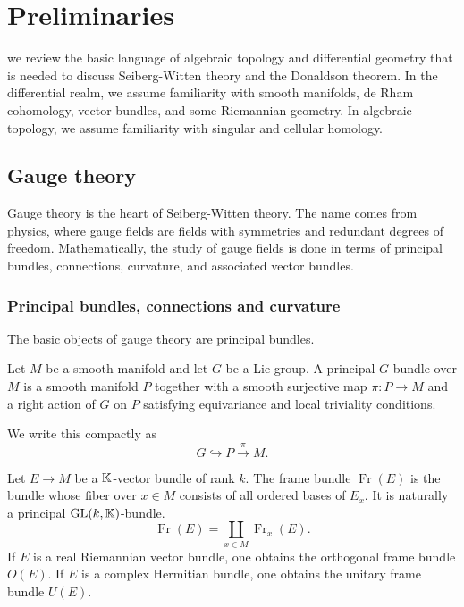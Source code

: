 \chapter{Preliminaries}

 we review the basic language of algebraic topology and differential geometry that is needed to discuss Seiberg-Witten theory and the Donaldson theorem. In the differential realm, we assume familiarity with smooth manifolds, de Rham cohomology, vector bundles, and some Riemannian geometry. In algebraic topology, we assume familiarity with singular and cellular homology.

\section{Gauge theory}
Gauge theory is the heart of Seiberg-Witten theory. The name comes from physics, where gauge fields are fields with symmetries and redundant degrees of freedom. Mathematically, the study of gauge fields is done in terms of principal bundles, connections, curvature, and associated vector bundles.

\subsection{Principal bundles, connections and curvature}
The basic objects of gauge theory are principal bundles.

\begin{definition}
Let $M$ be a smooth manifold and let $G$ be a Lie group. A principal $G$-bundle over $M$ is a smooth manifold $P$ together with a smooth surjective map $\pi\colon P\to M$ and a right action of $G$ on $P$ satisfying equivariance and local triviality conditions.
\end{definition}

We write this compactly as
\[
  G \hookrightarrow P \xrightarrow{\pi} M.
\]

\begin{example}
Let $E\to M$ be a $\mathbb{K}$-vector bundle of rank $k$. The frame bundle $\operatorname{Fr}(E)$ is the bundle whose fiber over $x\in M$ consists of all ordered bases of $E_x$. It is naturally a principal $\operatorname{GL}(k,\mathbb{K})$-bundle.
\[
  \operatorname{Fr}(E)=\coprod_{x\in M}\operatorname{Fr}_x(E).
\]
If $E$ is a real Riemannian vector bundle, one obtains the orthogonal frame bundle $O(E)$. If $E$ is a complex Hermitian bundle, one obtains the unitary frame bundle $U(E)$.
\end{example}

